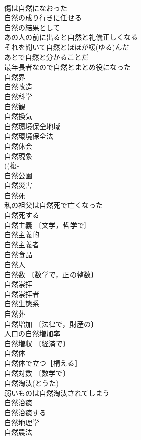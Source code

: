 \documentclass[8pt]{extreport}
\begin{document}
\begin{CJK}{UTF8}{min}
\\	傷は自然になおった 
\\	自然の成り行きに任せる 
\\	自然の結果として 
\\	あの人の前に出ると自然と礼儀正しくなる 
\\	それを聞いて自然とほほが緩(ゆる)んだ 
\\	あとで自然と分かることだ 
\\	最年長者なので自然とまとめ役になった 
\\	自然界 
\\	自然改造 
\\	自然科学 
\\	自然観 
\\	自然換気 
\\	自然環境保全地域 
\\	自然環境保全法 
\\	自然休会 
\\	自然現象 
\\	((複-
\\	自然公園 
\\	自然災害 
\\	自然死 
\\	私の祖父は自然死で亡くなった 
\\	自然死する 
\\	自然主義 〔文学，哲学で〕
\\	自然主義的 
\\	自然主義者 
\\	自然食品 
\\	自然人 
\\	自然数 〔数学で，正の整数〕
\\	自然崇拝 
\\	自然崇拝者 
\\	自然生態系 
\\	自然葬 
\\	自然増加 〔法律で，財産の〕
\\	人口の自然増加率 
\\	自然増収 〔経済で〕
\\	自然体 
\\	自然体で立つ［構える］ 
\\	自然対数 〔数学で〕
\\	自然淘汰(とうた) 
\\	弱いものは自然淘汰されてしまう 
\\	自然治癒 
\\	自然治癒する 
\\	自然地理学 
\\	自然農法 

\end{CJK}
\end{document}
